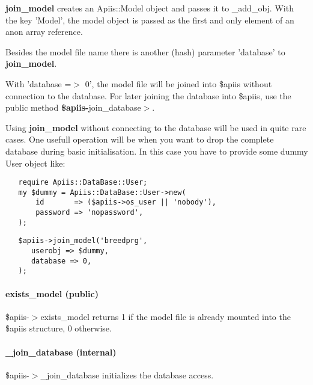 \textbf{join\_model} creates an Apiis::Model object and passes it to \_add\_obj.
With the key 'Model', the model object is passed as the first and
only element of an anon array reference.



Besides the model file name there is another (hash) parameter 'database' to
\textbf{join\_model}.



With 'database =$>$ 0', the model file will be joined into \$apiis without
connection to the database.  For later joining the database into \$apiis, use
the public method \textbf{\$apiis-}join\_database$>$.



Using \textbf{join\_model} without connecting to the database will be
used in quite rare cases. One usefull operation will be when you want to
drop the complete database during basic initialisation.
In this case you have to provide some dummy User object like:

\begin{verbatim}
   require Apiis::DataBase::User;
   my $dummy = Apiis::DataBase::User->new(
       id       => ($apiis->os_user || 'nobody'),
       password => 'nopassword',
   );
\end{verbatim}
\begin{verbatim}
   $apiis->join_model('breedprg',
      userobj => $dummy,
      database => 0,
   );
\end{verbatim}
\paragraph*{exists\_model (public)\label{Apiis::Init_--_Basic_initialisation_object_for_the_complete_APIIS_structure_exists_model_public_}}


\$apiis-$>$exists\_model returns 1 if the model file is already mounted into the
\$apiis structure, 0 otherwise.

\paragraph*{\_join\_database (internal)\label{Apiis::Init_--_Basic_initialisation_object_for_the_complete_APIIS_structure__join_database_internal_}}


\$apiis-$>$\_join\_database initializes the database access.



